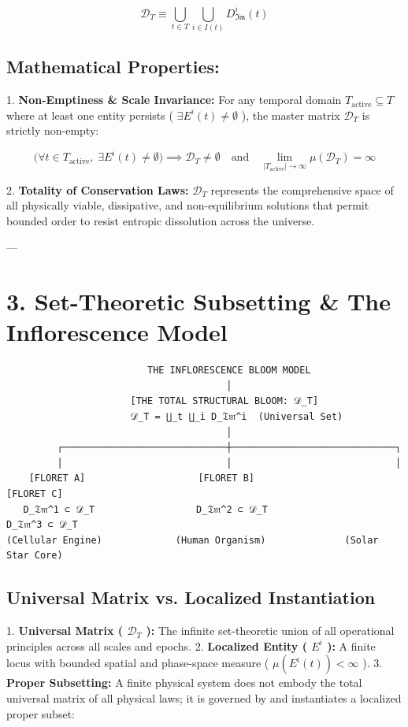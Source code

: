 \documentclass[11pt,a4paper]{article}
\theoremstyle{definition}
\theoremstyle{remark}
\begin{document}
\begin{equation}
\boxed{\mathcal{D}_T \equiv \bigcup_{t \in T} \bigcup_{i \in I(t)} D_{\mathfrak{Im}}^i(t)}
\end{equation}


\subsection{Mathematical Properties:}
1. \textbf{Non-Emptiness \& Scale Invariance:}
For any temporal domain $T_{\text{active}} \subseteq T$ where at least one entity persists ( $\exists E^i(t) \neq \emptyset$ ), the master matrix $\mathcal{D}_T$ is strictly non-empty:


\begin{equation}
\Big( \forall t \in T_{\text{active}}, \; \exists E^i(t) \neq \emptyset \Big) \implies \mathcal{D}_T \neq \emptyset \quad \text{and} \quad \lim_{|T_{\text{active}}| \to \infty} \mu(\mathcal{D}_T) = \infty
\end{equation}


2. \textbf{Totality of Conservation Laws:}
$\mathcal{D}_T$ represents the comprehensive space of all physically viable, dissipative, and non-equilibrium solutions that permit bounded order to resist entropic dissolution across the universe.

---

\section{3. Set-Theoretic Subsetting \& The Inflorescence Model}

\begin{verbatim}
                         THE INFLORESCENCE BLOOM MODEL
                                       │
                      [THE TOTAL STRUCTURAL BLOOM: 𝒟_T]
                      𝒟_T = ⋃_t ⋃_i D_𝔗𝔪^i  (Universal Set)
                                       │
         ┌─────────────────────────────┼─────────────────────────────┐
         │                             │                             │
    [FLORET A]                    [FLORET B]                    [FLORET C]
   D_𝔗𝔪^1 ⊂ 𝒟_T                  D_𝔗𝔪^2 ⊂ 𝒟_T                  D_𝔗𝔪^3 ⊂ 𝒟_T
(Cellular Engine)             (Human Organism)              (Solar Star Core)
\end{verbatim}

\subsection{Universal Matrix vs. Localized Instantiation}
1. \textbf{Universal Matrix ( $\mathcal{D}_T$ ):} The infinite set-theoretic union of all operational principles across all scales and epochs.
2. \textbf{Localized Entity ( $E^i$ ):} A finite locus with bounded spatial and phase-space measure ( $\mu(E^i(t)) < \infty$ ).
3. \textbf{Proper Subsetting:} A finite physical system does not embody the total universal matrix of all physical laws; it is governed by and instantiates a localized proper subset:
\end{document}

